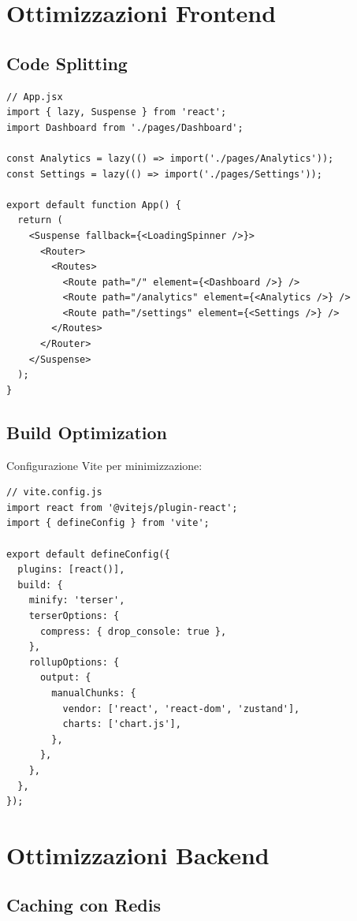 \documentclass[12pt,a4paper]{report}
\begin{document}
\section{Ottimizzazioni Frontend}

\subsection{Code Splitting}

\begin{lstlisting}
// App.jsx
import { lazy, Suspense } from 'react';
import Dashboard from './pages/Dashboard';

const Analytics = lazy(() => import('./pages/Analytics'));
const Settings = lazy(() => import('./pages/Settings'));

export default function App() {
  return (
    <Suspense fallback={<LoadingSpinner />}>
      <Router>
        <Routes>
          <Route path="/" element={<Dashboard />} />
          <Route path="/analytics" element={<Analytics />} />
          <Route path="/settings" element={<Settings />} />
        </Routes>
      </Router>
    </Suspense>
  );
}
\end{lstlisting}

\subsection{Build Optimization}

Configurazione Vite per minimizzazione:

\begin{lstlisting}
// vite.config.js
import react from '@vitejs/plugin-react';
import { defineConfig } from 'vite';

export default defineConfig({
  plugins: [react()],
  build: {
    minify: 'terser',
    terserOptions: {
      compress: { drop_console: true },
    },
    rollupOptions: {
      output: {
        manualChunks: {
          vendor: ['react', 'react-dom', 'zustand'],
          charts: ['chart.js'],
        },
      },
    },
  },
});
\end{lstlisting}

\section{Ottimizzazioni Backend}

\subsection{Caching con Redis}
\end{document}

